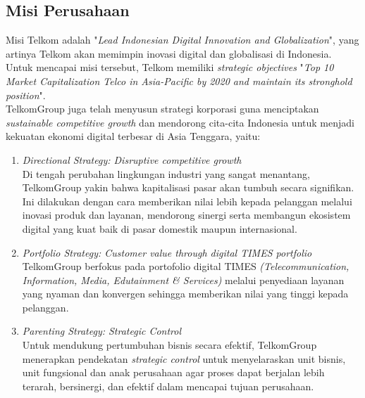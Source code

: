 \subsection{Misi Perusahaan}
\tab Misi Telkom adalah "\textit{Lead Indonesian Digital Innovation and Globalization}", yang artinya Telkom akan memimpin inovasi digital dan globalisasi di Indonesia. Untuk mencapai misi tersebut, Telkom memiliki \textit{strategic objectives} "\textit{Top 10 Market Capitalization Telco in Asia-Pacific by 2020 and maintain its stronghold position}".\\
\tab TelkomGroup juga telah menyusun strategi korporasi guna menciptakan \textit{sustainable competitive growth} dan mendorong cita-cita Indonesia untuk menjadi kekuatan ekonomi digital terbesar di Asia Tenggara, yaitu:
\begin{enumerate}
	\item \textit{Directional Strategy: Disruptive competitive growth}\\
	\tab Di tengah perubahan lingkungan industri yang sangat menantang, TelkomGroup yakin bahwa kapitalisasi pasar akan tumbuh secara signifikan. Ini dilakukan dengan cara memberikan nilai lebih kepada pelanggan melalui inovasi produk dan layanan, mendorong sinergi serta membangun ekosistem digital yang kuat baik di pasar domestik maupun internasional.\\
	\item \textit{Portfolio Strategy: Customer value through digital TIMES portfolio}\\
	\tab TelkomGroup berfokus pada portofolio digital TIMES \textit{(Telecommunication, Information, Media, Edutainment \& Services)} melalui penyediaan layanan yang nyaman dan konvergen sehingga memberikan nilai yang tinggi kepada pelanggan.\\
	\item \textit{Parenting Strategy: Strategic Control}\\
	\tab Untuk mendukung pertumbuhan bisnis secara efektif, TelkomGroup menerapkan pendekatan \textit{strategic control} untuk menyelaraskan unit bisnis, unit fungsional dan anak perusahaan agar proses dapat berjalan lebih terarah, bersinergi, dan efektif dalam mencapai tujuan perusahaan.
\end{enumerate}
	
